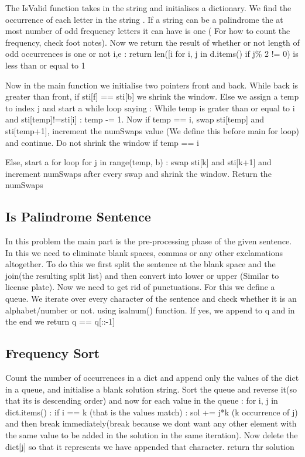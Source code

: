 \documentclass{article}
\newcommand{\nd}{\noindent}
\begin{document}
\nd The IsValid function takes in the string and initialises a dictionary. We find the occurrence of each letter in the string . If a string can be a palindrome the at most number of odd frequency letters it can have is one ( For how to count the frequency, check foot notes). Now we return the result of whether or not length of odd occurrences is one or not i,e : return len([i for i, j in d.items() if j\% 2 != 0) is less than or equal to 1 

\nd Now in the main function we initialise two pointers front and back. While back is greater than front, if sti[f] == sti[b] we shrink the window. Else we assign a temp to index j and start a while loop saying : While temp is grater than or equal to i and sti[temp]!=sti[i] : temp -= 1. Now if temp == i, swap sti[temp] and sti[temp+1], increment the numSwaps value (We define this before main for loop) and continue. Do not shrink the window if temp == i 

\nd Else, start a for loop for j in range(temp, b) : swap sti[k] and sti[k+1] and increment numSwaps after every swap and shrink the window. Return the numSwaps 

\subsection{Is Palindrome Sentence}
In this problem the main part is the pre-processing phase of the given sentence. In this we need to eliminate blank spaces, commas or any other exclamations altogether. To do this we first split the sentence at the blank space and the join(the resulting split list) and then convert into lower or upper (Similar to license plate). Now we need to get rid of punctuations. For this we define a queue. We iterate over every character of the sentence and check whether it is an alphabet/number or not. using isalnum() function. If yes, we append to q and in the end we return q == q[::-1]

\subsection{Frequency Sort}
Count the number of occurrences in a dict and append only the values of the dict in a queue, and initialise a blank solution string. Sort the queue and reverse it(so that its is descending order) and now for each value in the queue : for i, j in dict.items() : if i == k (that is the values match) : sol += j*k (k occurrence of j) and then break immediately(break because we dont want any other element with the same value to be added in the solution in the same iteration). Now delete the dict[j] so that it represents we have appended that character. return thr solution 
\end{document}

